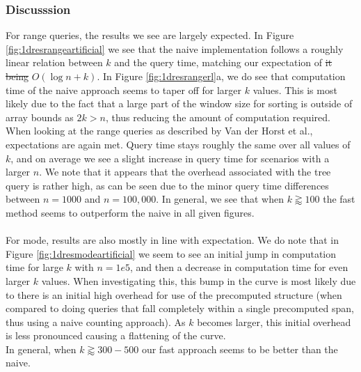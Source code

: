 \documentclass{article}
\newcommand{\fb}[1]{{\color{blue}#1}}
\newcommand{\fbrm}[1]{{\color{blue}\st{#1}}}
\begin{document}
\subsubsection*{Discusssion}
For range queries, the results we see are largely expected. In Figure \ref{fig:1dresrangeartificial} we see that the naive implementation follows a roughly linear relation between $k$ and the query time, mat\fb{ch}ing our expectation of \fbrm{it being} $O(\log n + k)$. In Figure \ref{fig:1dresrangerl}a, we do see that computation time of the naive approach seems to taper off for larger $k$ values. This is most likely due to the fact that a large part of the window size for sorting is outside of array bounds as $2k > n$, thus reducing the amount of computation required. 
When looking at the range queries as described by Van der Horst et al., expectations are again met. Query time stays roughly the same over all values of $k$, and on average we see a slight increase in query time for scenarios with a larger $n$. We note that it appears that the overhead associated with the tree query is rather high, as can be seen due to the minor query time differences between $n=1000$ and $n=100,000$. In general, we see that when $k \gtrapprox 100$ the fast method seems to outperform the naive in all given figures. \\\\
\fb{
    For mode, results are also mostly in line with expectation. We do note that in Figure \ref{fig:1dresmodeartificial} we seem to see an initial jump in computation time for large $k$ with $n=1e5$, and then a decrease in computation time for even larger $k$ values. When investigating this, this bump in the curve is most likely due to there is an initial high overhead for use of the precomputed structure (when compared to doing queries that fall completely within a single precomputed span, thus using a naive counting approach). As $k$ becomes larger, this initial overhead is less pronounced causing a flattening of the curve. \\
    In general, when $k \gtrapprox 300-500$ our fast approach seems to be better than the naive.
}
\end{document}
